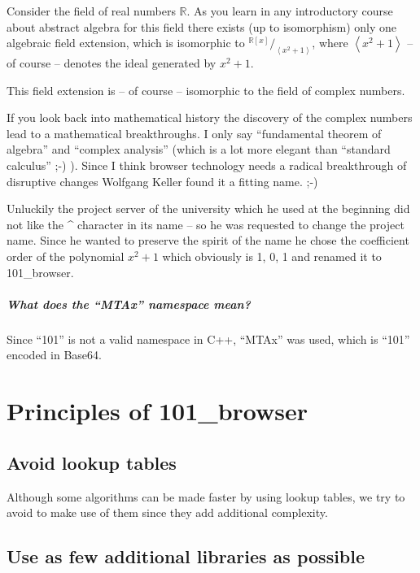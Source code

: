\documentclass[10pt]{scrbook}
\begin{document}
Consider the field of real numbers $\mathbb{R}$. As you learn in any introductory course about abstract algebra for this field there exists (up to isomorphism) only one algebraic field extension, which is isomorphic to $^{\mathbb{R}[x]}/_{\left\langle x^2+1\right\rangle}$, where $\left\langle x^2+1\right\rangle$ -- of course -- denotes the ideal generated by $x^2+1$.

This field extension is -- of course -- isomorphic to the field of complex numbers.

If you look back into mathematical history the discovery of the complex numbers lead to a mathematical breakthroughs. I only say "`fundamental theorem of algebra"' and "`complex analysis"' (which is a lot more elegant than "`standard calculus"' ;-) ). Since I think browser technology needs a radical breakthrough of disruptive changes Wolfgang Keller found it a fitting name. ;-)

Unluckily the project server of the university which he used at the beginning did not like the \^{} character in its name -- so he was requested to change the project name. Since he wanted to preserve the spirit of the name he chose the coefficient order of the polynomial $x^2+1$ which obviously is 1, 0, 1 and renamed it to 101\_browser.

\paragraph{What does the "`MTAx"' namespace mean?}

Since "`101"' is not a valid namespace in C++, "`MTAx"' was used, which is "`101"' encoded in Base64.

\chapter{Principles of 101\_browser}

\section{Avoid lookup tables}

Although some algorithms can be made faster by using lookup tables, we try to avoid to make use of them since they add additional complexity.

\section{Use as few additional libraries as possible}
\end{document}

